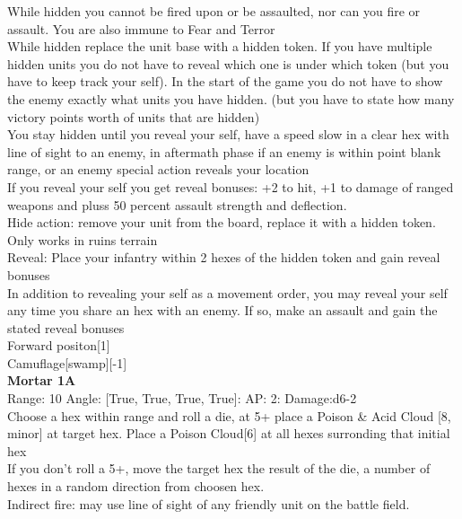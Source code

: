 While hidden you cannot be fired upon or be assaulted, nor can you fire or assault. You are also immune to Fear and Terror\\ 
While hidden replace the unit base with a hidden token. If you have multiple hidden units you do not have to reveal which one is under which token (but you have to keep track your self). In the start of the game you do not have to show the enemy exactly what units you have hidden. (but you have to state how many victory points worth of units that are hidden)\\ 
You stay hidden until you reveal your self, have a speed slow in a clear hex with line of sight to an enemy, in aftermath phase if an enemy is within point blank range, or an enemy special action reveals your location\\ 
If you reveal your self you get reveal bonuses: +2 to hit, +1 to damage of ranged weapons and pluss 50 percent assault strength and deflection.\\ 
Hide action: remove your unit from the board, replace it with a hidden token. Only works in ruins terrain\\ 
Reveal: Place your infantry within 2 hexes of the hidden token and gain reveal bonuses\\ 
In addition to revealing your self as a movement order, you may reveal your self any time you share an hex with an enemy. If so, make an assault and gain the stated reveal bonuses\\ 
Forward positon[1]\\ 
Camuflage[swamp][-1]\\ 





{\bf Mortar 1A } \\



Range: 10  Angle: [True, True, True, True]: AP: 2: Damage:d6-2 \\
Choose a hex within range and roll a die, at 5+ place a Poison \& Acid Cloud [8, minor] at target hex. Place a Poison Cloud[6]  at all hexes surronding that initial hex\\ 
If you don't roll a 5+, move the target hex the result of the die, a number of hexes in a random direction from choosen hex.\\ 
Indirect fire: may use line of sight of any friendly unit on the battle field.\\ 





